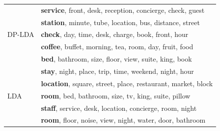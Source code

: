 \begin{table}[th]
\begin{tabular}{|l|l|}
\multirow{5}{30px}{DP-LDA}
& \textbf{service}, front, desk, reception, concierge, check, guest \\
& \textbf{station}, minute, tube, location, bus, distance, street \\
& \textbf{check}, day, time, desk, charge, book, front, hour \\
& \textbf{coffee}, buffet, morning, tea, room, day, fruit, food \\
& \textbf{bed}, bathroom, size, floor, view, suite, king, book \\\hline

\multirow{5}{*}{LDA}
& \textbf{stay}, night, place, trip, time, weekend, night, hour \\
& \textbf{location}, square, street, place, restaurant, market, block \\
& \textbf{room}, bed, bathroom, size, tv, king, suite, pillow \\
& \textbf{staff}, service, desk, location, concierge, room, night \\
& \textbf{room}, floor, noise, view, night, water, door, bathroom \\\hline
\end{tabular}
\end{table}

